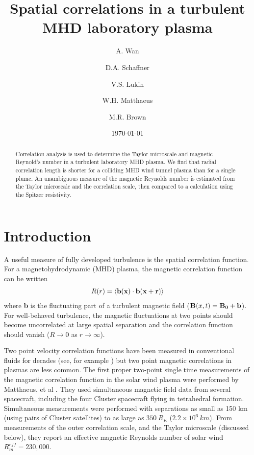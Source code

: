 \documentclass[aip,prl,amsmath,amssymb,reprint,superscriptaddress]{revtex4-1} %
\begin{document}
\title{Spatial correlations in a turbulent MHD laboratory plasma}

\author{A. Wan}
\author{D.A. Schaffner}
\author{V.S. Lukin}
\author{W.H. Matthaeus}
\author{M.R. Brown}
\date{\today}
\begin{abstract}
Correlation analysis is used to determine the Taylor microscale and magnetic Reynold's number in a turbulent laboratory MHD plasma.  We find that radial correlation length is shorter for a colliding MHD wind tunnel plasma than for a single plume.  An unambiguous measure of the magnetic Reynolds number is estimated from the Taylor microscale and the correlation scale, then compared to a calculation using the Spitzer resistivity.
\end{abstract}

\maketitle

\section{Introduction}

A useful measure of fully developed turbulence is the spatial correlation function.  For a magnetohydrodynamic (MHD) plasma, the magnetic correlation function can be written
%
\begin{equation}
R(r) =  \langle {\bf b(x) \cdot b(x + r)} \rangle
\label{eq:correlation1}
\end{equation}
%
where {\bf b} is the fluctuating part of a turbulent magnetic field (${\bf B}(x, t) = {\bf B_0 + b}$).  For well-behaved turbulence, the magnetic fluctuations at two points should become uncorrelated at large spatial separation and the correlation function should vanish ($R \rightarrow 0$ as $r \rightarrow \infty$).  

Two point velocity correlation functions have been measured in conventional fluids for decades (see, for example \cite{Belmabrouk98}) but two point magnetic correlations in plasmas are less common.  The first proper two-point single time measurements of the magnetic correlation function in the solar wind plasma were performed by Matthaeus, et al \cite{Matthaeus05}.  They used simultaneous magnetic field data from several spacecraft, including the four Cluster spacecraft flying in tetrahedral formation.  Simultaneous measurements were performed with separations as small as 150 km (using pairs of Cluster satellites) to as large as $350~R_E$ ($2.2 \times 10^6~km$).  From measurements of the outer correlation scale, and the Taylor microscale (discussed below), they report an effective magnetic Reynolds number of solar wind $R_m^{eff}  = 230,000$.
\end{document}

